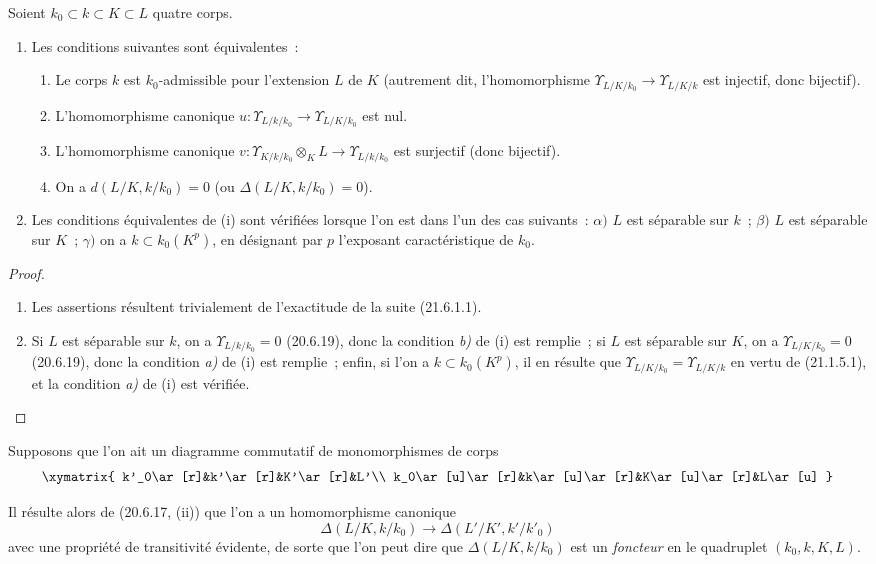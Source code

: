 \begin{proposition}[21.6.2]
\label{0.21.6.2-fr}
Soient $k_0\subset k\subset K\subset L$ quatre corps.
\begin{enumerate}
  \item[\rm (i)] Les conditions suivantes sont équivalentes~:
  \begin{enumerate}
    \item[\rm a)] Le corps $k$ est $k_0$-admissible pour l'extension $L$ de $K$
    (autrement dit, l'homomorphisme $\Upsilon_{L/K/k_0}\to
    \Upsilon_{L/K/k}$ est injectif, donc bijectif).
    \item[\rm b)] L'homomorphisme canonique
    $u:\Upsilon_{L/k/k_0}\to\Upsilon_{L/K/k_0}$ est nul.
    \item[\rm c)] L'homomorphisme canonique
    $v:\Upsilon_{K/k/k_0}\otimes_KL\to\Upsilon_{L/k/k_0}$ est surjectif
    (donc bijectif).
    \item[\rm d)] On a $d(L/K,k/k_0)=0$ (ou
    $\Delta(L/K,k/k_0)=0$).
  \end{enumerate}
  \item[\rm (ii)] Les conditions équivalentes de \textup{(i)} sont vérifiées lorsque
  l'on est dans l'un des cas suivants~: $\alpha)$ $L$ est séparable sur $k$~;
  $\beta)$ $L$ est séparable sur $K$~; $\gamma)$ on a
  $k\subset k_0(K^p)$, en désignant par $p$ l'exposant caractéristique de $k_0$.
\end{enumerate}
\end{proposition}

\begin{proof}
\begin{enumerate}
  \item[(i)] Les assertions résultent trivialement de l'exactitude de la suite
  (21.6.1.1).
  \item[(ii)] Si $L$ est séparable sur $k$, on a
  $\Upsilon_{L/k/k_0}=0$ (20.6.19), donc la condition \emph{b)} de (i) est remplie~;
  si $L$ est séparable sur $K$, on a
  $\Upsilon_{L/K/k_0}=0$ (20.6.19), donc la condition \emph{a)} de (i) est remplie~;
  enfin, si l'on a $k\subset k_0(K^p)$, il en résulte que
  $\Upsilon_{L/K/k_0}=\Upsilon_{L/K/k}$ en vertu de (21.1.5.1), et la
  condition \emph{a)} de (i) est vérifiée.
\end{enumerate}
\end{proof}
\begin{env}[21.6.3]
\label{0.21.6.3-fr}
Supposons que l'on ait un diagramme commutatif de monomorphismes de corps
\[
\xymatrix{
 k'_0\ar[r]&k'\ar[r]&K'\ar[r]&L'\\
 k_0\ar[u]\ar[r]&k\ar[u]\ar[r]&K\ar[u]\ar[r]&L\ar[u]
}
\]

Il résulte alors de (20.6.17, (ii)) que l'on a un homomorphisme canonique
\begin{equation}
\tag{21.6.3.1}
\label{0.21.6.3.1-fr}
\Delta(L/K,k/k_0)\longrightarrow\Delta(L'/K',k'/k'_0)
\end{equation}
avec une propriété de transitivité évidente, de sorte que l'on peut dire que
$\Delta(L/K,k/k_0)$ est un \emph{foncteur} en le quadruplet
$(k_0,k,K,L)$.
\end{env}

